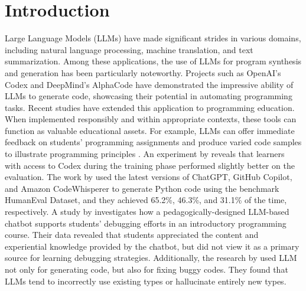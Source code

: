 \documentclass[sigconf,authordraft]{acmart}
\begin{document}
\section{Introduction}

Large Language Models (LLMs) have made significant strides in various domains, including natural language processing, machine translation, and text summarization. Among these applications, the use of LLMs for program synthesis and generation has been particularly noteworthy. Projects such as OpenAI's Codex and DeepMind's AlphaCode have demonstrated the impressive ability of LLMs to generate code, showcasing their potential in automating programming tasks. Recent studies have extended this application to programming education. When implemented responsibly and within appropriate contexts, these tools can function as valuable educational assets. For example, LLMs can offer immediate feedback on students' programming assignments and produce varied code samples to illustrate programming principles \cite{kumar2024impactguidanceinteractionstrategies}. An experiment by \cite{10.1145/3545945.3569830} reveals that learners with access to Codex during the training phase performed slightly better on the evaluation.
The work by \cite{yetiştiren2023evaluatingcodequalityaiassisted} used the latest versions of ChatGPT, GitHub Copilot, and Amazon CodeWhisperer to generate Python code using the benchmark HumanEval Dataset, and they achieved 65.2\%, 46.3\%, and 31.1\% of the time, respectively. A study by \cite{10.1145/3544548.3580919} investigates how a pedagogically-designed LLM-based chatbot supports students’ debugging efforts in an introductory programming course. Their data revealed that students appreciated the content and experiential knowledge provided by the chatbot, but did not view it as a primary source for learning debugging strategies. Additionally, the research by \cite{6:1:1} used LLM not only for generating code, but also for fixing buggy codes. They found that LLMs tend to incorrectly use existing types or hallucinate entirely new types.
\end{document}
